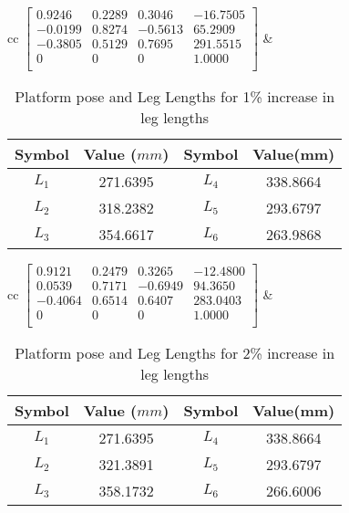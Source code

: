 \documentclass[10pt]{article}
\begin{document}
\begin{table*}[h!]
	\centering
	\begin{tabular}{cc}
		$\begin{bmatrix}
		0.9246  & 0.2289 & 0.3046  & -16.7505 \\ 
		-0.0199 & 0.8274 & -0.5613 & 65.2909  \\ 
		-0.3805 & 0.5129 & 0.7695  & 291.5515 \\ 
		0       & 0      & 0       & 1.0000   \\ 
		\end{bmatrix}$
		& 
		\begin{tabular}{cccc}
			\hline
			Symbol & Value ($mm$) & Symbol & Value(mm) \\
			\hline
			$L_1$ & 271.6395 & $L_4$ & 338.8664\\
			$L_2$ & 318.2382 & $L_5$ & 293.6797\\
			$L_3$ & 354.6617 & $L_6$ & 263.9868\\	 	\hline
		\end{tabular}
	\end{tabular}
	\caption{Platform pose and Leg Lengths for 1\% increase in leg lengths}
\end{table*}

\begin{table*}[h!]
	\centering
	\begin{tabular}{cc}
		$\begin{bmatrix}
		0.9121  & 0.2479 & 0.3265  & -12.4800 \\ 
		0.0539  & 0.7171 & -0.6949 & 94.3650  \\ 
		-0.4064 & 0.6514 & 0.6407  & 283.0403 \\ 
		0       & 0      & 0       & 1.0000   \\ 
		\end{bmatrix}$
		& 
		\begin{tabular}{cccc}
			\hline
			Symbol & Value ($mm$) & Symbol & Value(mm) \\
			\hline
			$L_1$ & 271.6395 & $L_4$ & 338.8664\\
			$L_2$ & 321.3891 & $L_5$ & 293.6797\\
			$L_3$ & 358.1732 & $L_6$ & 266.6006\\	 	\hline
		\end{tabular}
	\end{tabular}
	\caption{Platform pose and Leg Lengths for 2\% increase in leg lengths}
\end{table*}
\end{document}
